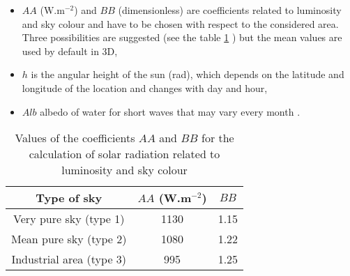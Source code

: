 \begin{itemize}
\item $AA$ ($\mathrm{{W}.m^{-2}}$) and $BB$ (dimensionless) are coefficients
related to luminosity and sky colour and have to be chosen with respect to the
considered area. Three possibilities are suggested (see the table \ref{tab_sky_type}%
) but the mean values are used by default in 3D,
\item $h$ is the angular height of the sun (rad), which depends on the latitude and
longitude of the location and changes with day and hour,
\item $Alb$ albedo of water for short waves that may vary every month
\cite{payne_albedo_1972}.
\end{itemize}

\begin{table}[ptbh]
\caption{Values of the coefficients $AA$ and $BB$ for the calculation of solar
radiation related to luminosity and sky colour }%
\label{tab_sky_type}%
\centering
\begin{tabular}
[c]{|c|c|c|}\hline
Type of sky & $AA$ (W.m$^{-2}$) & $BB$\\\hline
Very pure sky (type 1) & 1130 & 1.15\\\hline
Mean pure sky (type 2) & 1080 & 1.22\\\hline
Industrial area (type 3) & 995 & 1.25\\\hline
\end{tabular}
\end{table}

